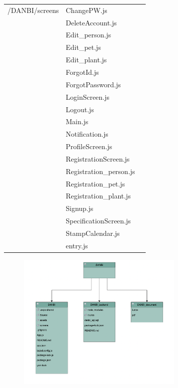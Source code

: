 \documentclass[conference]{IEEEtran}
\begin{document}
\begin{table}[h!]
\begin{threeparttable}
\begin{tabular}{p{2.4cm}p{2.8cm}p{2cm}}
            \hline
            /DANBI/screens 
            & ChangePW.js\\
            & DeleteAccount.js\\
            & Edit\_person.js\\
            & Edit\_pet.js\\
            & Edit\_plant.js\\
            & ForgotId.js\\
            & ForgotPassword.js\\
            & LoginScreen.js\\
            & Logout.js\\
            & Main.js\\
            & Notification.js\\
            & ProfileScreen.js\\
            & RegistrationScreen.js\\
            & Registration\_person.js\\
            & Registration\_pet.js\\
            & Registration\_plant.js\\
            & Signup.js\\
            & SpecificationScreen.js\\
            & StampCalendar.js\\
            & entry.js\\
            \bottomrule
            \end{tabular}
        \end{threeparttable}
    \end{table}
    
\par \begin{figure}[h!]
\includegraphics[width=8cm]{image/repo.png}
\centering
\caption{}
\label{fig:repo}
\end{figure}
\end{document}
